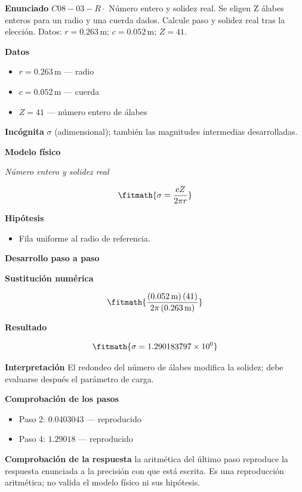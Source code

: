 \documentclass[10pt,openany]{book}
\begin{document}
\begin{tcolorbox}[title={Problema resuelto 3}, studiumworked, breakable]

\noindent\textbf{Enunciado}
\(C08-03-R \cdot\) Número entero y solidez real. Se eligen Z álabes enteros para un radio y una cuerda dados. Calcule paso y solidez real tras la elección. Datos: \(r=0.263\, \mathrm{m}\); \(c=0.052\, \mathrm{m}\); \(Z=41\).

\noindent\textbf{Datos}
\begin{itemize}
\item $r = 0.263\,\mathrm{m}$ — radio
\item $c = 0.052\,\mathrm{m}$ — cuerda
\item $Z = 41$ — número entero de álabes
\end{itemize}

\noindent\textbf{Incógnita}
$\sigma$ (adimensional); también las magnitudes intermedias desarrolladas.

\noindent\textbf{Modelo físico}

\noindent\textit{Número entero y solidez real}

\[
\fitmath{\sigma=\frac{c Z}{2 \pi r}}
\]

\noindent\textbf{Hipótesis}
\begin{itemize}
\item Fila uniforme al radio de referencia.
\end{itemize}

\noindent\textbf{Desarrollo paso a paso}



\noindent\textbf{Sustitución numérica}

\[
\fitmath{\frac{\left(0.052\,\mathrm{m}\right) \left(41\right)}{2 \pi \left(0.263\,\mathrm{m}\right)}}
\]

\noindent\textbf{Resultado}

\[
\fitmath{\sigma=1.290183797\times10^{0}}
\]

\noindent\textbf{Interpretación}
El redondeo del número de álabes modifica la solidez; debe evaluarse después el parámetro de carga.

\noindent\textbf{Comprobación de los pasos}
\begin{itemize}
\item Paso 2: $0.0403043$ — reproducido
\item Paso 4: $1.29018$ — reproducido
\end{itemize}

\noindent\textbf{Comprobación de la respuesta} la aritmética del último paso reproduce la respuesta enunciada a la precisión con que está escrita. Es una reproducción aritmética; no valida el modelo físico ni sus hipótesis.


\end{tcolorbox}
\end{document}
